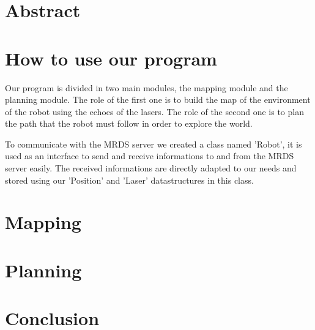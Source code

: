 \documentclass{report}
\begin{document}


\chapter*{Abstract}


\tableofcontents

\chapter{How to use our program}


Our program is divided in two main modules, the mapping module and the planning module.
The role of the first one is to build the map of the environment of the robot using the echoes of the lasers.
The role of the second one is to plan the path that the robot must follow in order to explore the world.

To communicate with the MRDS server we created a class named 'Robot', it is used as an interface to send and receive informations to and from the MRDS server easily.
The received informations are directly adapted to our needs and stored using our 'Position' and 'Laser' datastructures in this class.

\chapter{Mapping}


\chapter{Planning}


\chapter*{Conclusion}


\listofalgorithms
{}
\end{document}
